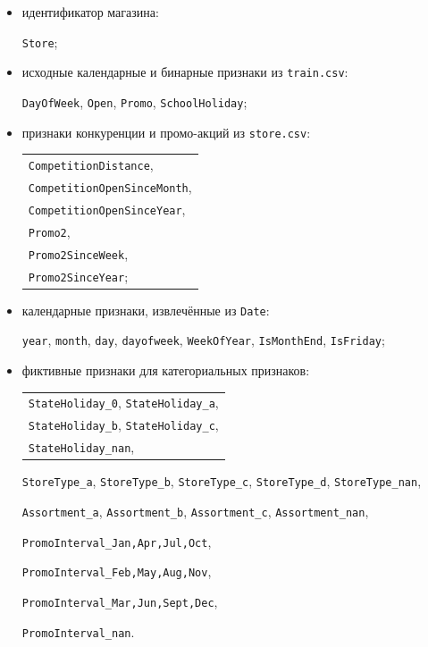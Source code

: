\documentclass[12pt,a4paper]{article}
\numberwithin{equation}{section}
\begin{document}
\begin{itemize}
    \item идентификатор магазина:
    
    \texttt{Store};

    \item исходные календарные и бинарные признаки из \texttt{train.csv}:
    
    \texttt{DayOfWeek},
    \texttt{Open},
    \texttt{Promo},
    \texttt{SchoolHoliday};

    \item признаки конкуренции и промо-акций из \texttt{store.csv}:
    
    \begin{tabular}{@{}l@{}}
    \texttt{CompetitionDistance},\\
    \texttt{CompetitionOpenSinceMonth},\\
    \texttt{CompetitionOpenSinceYear},\\
    \texttt{Promo2},\\
    \texttt{Promo2SinceWeek},\\
    \texttt{Promo2SinceYear};
    \end{tabular}

    \item календарные признаки, извлечённые из \texttt{Date}:
    
    \texttt{year},
    \texttt{month},
    \texttt{day},
    \texttt{dayofweek},
    \texttt{WeekOfYear},
    \texttt{IsMonthEnd},
    \texttt{IsFriday};

    \item фиктивные признаки для категориальных признаков:
    
    \begin{tabular}{@{}l@{}}
    \texttt{StateHoliday\_0}, \texttt{StateHoliday\_a},\\
    \texttt{StateHoliday\_b}, \texttt{StateHoliday\_c},\\
    \texttt{StateHoliday\_nan},
    \end{tabular}
    
    \texttt{StoreType\_a},
    \texttt{StoreType\_b},
    \texttt{StoreType\_c},
    \texttt{StoreType\_d},
    \texttt{StoreType\_nan},
    
    \texttt{Assortment\_a},
    \texttt{Assortment\_b},
    \texttt{Assortment\_c},
    \texttt{Assortment\_nan},
    
    \texttt{PromoInterval\_Jan,Apr,Jul,Oct},
    
    \texttt{PromoInterval\_Feb,May,Aug,Nov},
    
    \texttt{PromoInterval\_Mar,Jun,Sept,Dec},
    
    \texttt{PromoInterval\_nan}.
\end{itemize}
\end{document}
